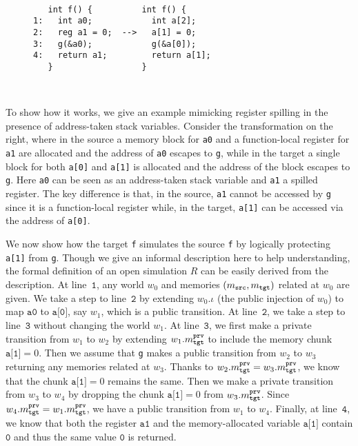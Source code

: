 \begin{wrapfigure}{r}{0.45\textwidth}
\begin{minipage}{0.45\textwidth}
\mbox{}\\[-7mm]    
\begin{Verbatim}
   int f() {          int f() {     
1:   int a0;            int a[2];   
2:   reg a1 = 0;  -->   a[1] = 0;   
3:   g(&a0);            g(&a[0]);   
4:   return a1;         return a[1];
   }                  }
\end{Verbatim}
\mbox{}\\[-10mm]
\end{minipage}
\end{wrapfigure}
To show how it works,
we give an example mimicking register spilling
in the presence of address-taken stack variables.
Consider the transformation on the right, where
in the source a memory block for \texttt{a0} and a function-local register for \texttt{a1} are allocated and
the address of \texttt{a0} escapes to \texttt{g},
while in the target a single block for both \texttt{a[0]} and \texttt{a[1]}
is allocated and the address of the block escapes to \texttt{g}.
Here \texttt{a0} can be seen as an address-taken stack variable and \texttt{a1} a spilled register.
The key difference is that, in the source, \texttt{a1} cannot be accessed by
\texttt{g} since it is a function-local register
while, in the target, \texttt{a[1]} can be accessed via the address of \texttt{a[0]}.

We now show how the target \texttt{f} simulates the source \texttt{f}
by logically protecting \texttt{a[1]} from \texttt{g}.
Though we give an informal description here to help understanding,
the formal definition of an open simulation $R$ 
can be easily derived from the description.
At line~$\texttt{1}$, any world $w_0$ and
memories $(m_{\texttt{src}}, m_{\texttt{tgt}})$ related at $w_0$ are given. We take a step
to line~$\texttt{2}$ by extending $w_0.\iota$ (\ie the public
injection of $w_0$) to map $\texttt{a0}$ to $\texttt{a[0]}$, say $w_1$,
which is a public transition. At line~$\texttt{2}$, we take a step
to line~$\texttt{3}$ without changing the world $w_1$.
At line~$\texttt{3}$, we first make a private transition from $w_1$
to $w_2$ by extending $w_1.m^{\texttt{prv}}_{\texttt{tgt}}$
to include the memory chunk $\texttt{a[1]} = 0$.
Then we assume that \texttt{g} makes a public transition from $w_2$ to $w_3$
returning any memories related at $w_3$. Thanks to $w_2.m^{\texttt{prv}}_{\texttt{tgt}} = w_3.m^{\texttt{prv}}_{\texttt{tgt}}$,
we know that the chunk $\texttt{a[1]} = 0$ remains the same.
Then we make a private transition from $w_3$ to $w_4$ by
dropping the chunk $\texttt{a[1]} = 0$ from $w_3.m^{\texttt{prv}}_{\texttt{tgt}}$.
Since $w_4.m^{\texttt{prv}}_{\texttt{tgt}} = w_1.m^{\texttt{prv}}_{\texttt{tgt}}$, we have a public transition from $w_1$ to $w_4$.
Finally, at line~$\texttt{4}$, we know that both the register $\texttt{a1}$ and
the memory-allocated variable $\texttt{a[1]}$ contain
$\texttt{0}$ and thus the same value $\texttt{0}$ is returned.

